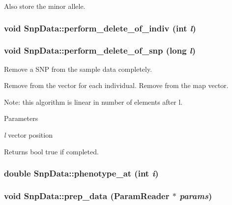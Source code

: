Also store the minor allele. \hypertarget{classSnpData_a569da0a2d95bb510663ceb71717408e2}{
\subsubsection[{perform\_\-delete\_\-of\_\-indiv}]{\setlength{\rightskip}{0pt plus 5cm}void SnpData::perform\_\-delete\_\-of\_\-indiv (int {\em l})}}
\label{classSnpData_a569da0a2d95bb510663ceb71717408e2}
\hypertarget{classSnpData_a7a1858e40b26cb6ded5d3e8009ed2b49}{
\subsubsection[{perform\_\-delete\_\-of\_\-snp}]{\setlength{\rightskip}{0pt plus 5cm}void SnpData::perform\_\-delete\_\-of\_\-snp (long {\em l})}}
\label{classSnpData_a7a1858e40b26cb6ded5d3e8009ed2b49}
Remove a SNP from the sample data completely.

Remove from the vector for each individual. Remove from the map vector.

Note: this algorithm is linear in number of elements after l.


\begin{DoxyParams}{Parameters}
\item[{\em l}]vector position \end{DoxyParams}
\begin{DoxyReturn}{Returns}
bool true if completed. 
\end{DoxyReturn}
\hypertarget{classSnpData_a534016cfdc6e5ec19076a4f38d80dce2}{
\subsubsection[{phenotype\_\-at}]{\setlength{\rightskip}{0pt plus 5cm}double SnpData::phenotype\_\-at (int {\em i})}}
\label{classSnpData_a534016cfdc6e5ec19076a4f38d80dce2}
\hypertarget{classSnpData_a856afb537dc90f0e45c2d3a28d6a8b41}{
\subsubsection[{prep\_\-data}]{\setlength{\rightskip}{0pt plus 5cm}void SnpData::prep\_\-data ({\bf ParamReader} $\ast$ {\em params})}}
\label{classSnpData_a856afb537dc90f0e45c2d3a28d6a8b41}


